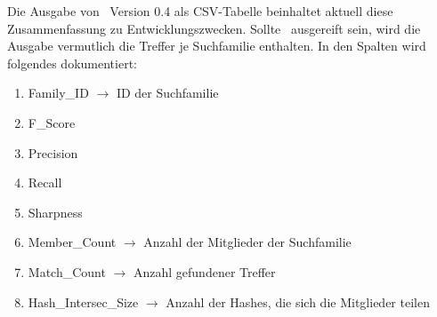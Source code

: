 \begin{enumerate}[a)]
                Die Ausgabe von \protfin\ Version 0.4 als \ac{CSV}-Tabelle beinhaltet aktuell diese Zusammenfassung zu Entwicklungszwecken. Sollte \protfin\ ausgereift sein, wird die Ausgabe vermutlich die Treffer je Suchfamilie enthalten. In den Spalten wird folgendes dokumentiert:
                \begin{enumerate}[1.]
                    \item Family\_ID $\rightarrow$ ID der Suchfamilie
                    \item F\_Score
                    \item Precision
                    \item Recall
                    \item Sharpness 
                    \item Member\_Count $\rightarrow$ Anzahl der Mitglieder der Suchfamilie
                    \item Match\_Count $\rightarrow$ Anzahl gefundener Treffer
                    \item Hash\_Intersec\_Size $\rightarrow$ Anzahl der Hashes, die sich die Mitglieder teilen
                \end{enumerate}
        \end{enumerate}

